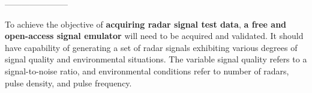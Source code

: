
-----------------------

To achieve the objective of \textbf{acquiring radar signal test data}, \textbf{a free and open-access signal emulator} will need to be acquired and validated. 
It should have capability of  generating a set of radar signals exhibiting various degrees of signal quality and environmental situations. 
The variable signal quality refers to a signal-to-noise ratio, and environmental conditions refer to number of radars, pulse density, and pulse frequency.








